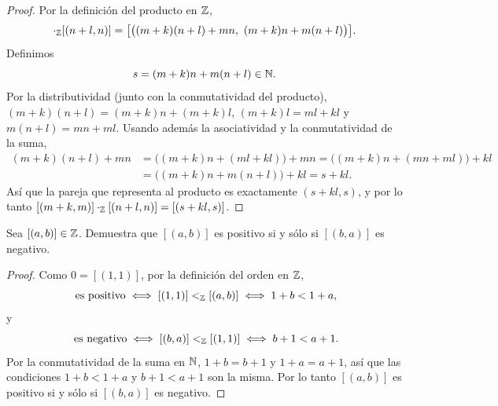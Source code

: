 \documentclass[12pt,a4paper]{article}
\begin{document}
    \begin{proof}
        Por la definición del producto en $\mathbb{Z}$,
        \begin{equation*}
            [(m+k,m)]\cdot_{\Z}[(n+l,n)]=\big[\big((m+k)(n+l)+mn,\ (m+k)n+m(n+l)\big)\big].
        \end{equation*}
        Definimos
        \begin{equation*}
            s=(m+k)n+m(n+l)\in\mathbb{N}.
        \end{equation*}
        Por la distributividad (junto con la conmutatividad del producto), $(m+k)(n+l)=(m+k)n+(m+k)l$,
        $(m+k)l=ml+kl$ y $m(n+l)=mn+ml$. Usando además la asociatividad y la conmutatividad de la suma,
        \begin{align*}
            (m+k)(n+l)+mn &= \big((m+k)n+(ml+kl)\big)+mn = \big((m+k)n+(mn+ml)\big)+kl\\
            &= \big((m+k)n+m(n+l)\big)+kl = s+kl.
        \end{align*}
        Así que la pareja que representa al producto es exactamente $(s+kl,s)$, y por lo tanto
        $[(m+k,m)]\cdot_{\mathbb{Z}}[(n+l,n)]=[(s+kl,s)]$.
    \end{proof}

    \begin{problema}
        Sea $[(a,b)]\in\mathbb{Z}$. Demuestra que $[(a,b)]$ es positivo si y sólo si $[(b,a)]$ es negativo.
    \end{problema}

    \begin{proof}
        Como $0=[(1,1)]$, por la definición del orden en $\mathbb{Z}$,
        \begin{equation*}
            [(a,b)] \text{ es positivo} \iff [(1,1)]<_{\Z}[(a,b)] \iff 1+b<1+a,
        \end{equation*}
        y
        \begin{equation*}
            [(b,a)] \text{ es negativo} \iff [(b,a)]<_{\Z}[(1,1)] \iff b+1<a+1.
        \end{equation*}
        Por la conmutatividad de la suma en $\mathbb{N}$, $1+b=b+1$ y $1+a=a+1$, así que las condiciones $1+b<1+a$ y
        $b+1<a+1$ son la misma. Por lo tanto $[(a,b)]$ es positivo si y sólo si $[(b,a)]$ es negativo.
    \end{proof}
\end{document}
